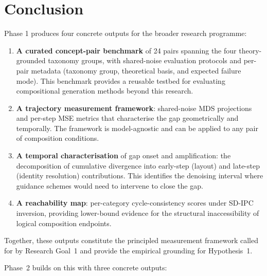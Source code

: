 
\section{Conclusion}
\label{sec:conclusion}
Phase 1 produces four concrete outputs for the broader research programme:

\begin{enumerate}

    \item \textbf{A curated concept-pair benchmark} of 24 pairs spanning the four theory-grounded taxonomy groups, with shared-noise evaluation protocols and per-pair metadata (taxonomy group, theoretical basis, and expected failure mode).
    This benchmark provides a reusable testbed for evaluating compositional generation methods beyond this research.

    \item \textbf{A trajectory measurement framework}: shared-noise MDS projections and per-step MSE metrics that characterise the gap geometrically and temporally.
    The framework is model-agnostic and can be applied to any pair of composition conditions.

    \item \textbf{A temporal characterisation} of gap onset and amplification: the decomposition of cumulative divergence into early-step (layout) and late-step (identity resolution) contributions.
    This identifies the denoising interval where guidance schemes would need to intervene to close the gap.

    \item \textbf{A reachability map}: per-category cycle-consistency scores under SD-IPC inversion, providing lower-bound evidence for the structural inaccessibility of logical composition endpoints.

\end{enumerate}

Together, these outputs constitute the principled measurement framework called for by Research Goal~1 and provide the empirical grounding for Hypothesis~1.

Phase~2 builds on this with three concrete outputs:

